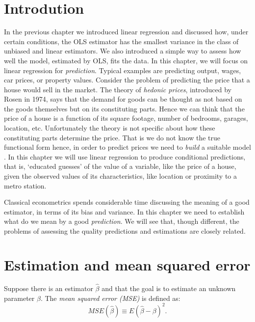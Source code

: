 \section{Introdution}



In the previous chapter we introduced linear regression and discussed how, under certain conditions, the OLS estimator has the smallest variance in the class of unbiased and linear estimators.  We also introduced a simple way to assess how well the model, estimated by OLS, fits the data. In this chapter, we will focus on linear regression for \emph{prediction}. Typical examples are predicting output, wages, car prices, or property values. Consider the problem of predicting the price that a house would sell in the market. The theory of \emph{hedonic prices}, introduced by Rosen in 1974\cite{rosen1974hedonic}, says that the demand for goods can be thought as not based on the goods themselves but on its constituting parts. Hence we can think that the  price of a house  is a function of its square footage, number of bedrooms, garages,  location, etc. Unfortunately the theory is not specific about how these constituting parts determine the price. That is we do not know the true functional form hence, in order to predict prices we need to \emph{build} a suitable model . In this chapter we will use linear regression to produce conditional predictions, that is, `educated guesses' of the value of a variable, like the price of a house, given the observed values of its characteristics, like location or proximity to a metro station. 

Classical econometrics spends considerable time discussing the meaning of a good estimator, in terms of its bias and variance. In this chapter we need to establish what do we mean by a good \emph{prediction}. We will see that, though different, the problems of assessing the quality predictions and estimations are closely related. 


\section{Estimation and mean squared error}


Suppose there is an estimator $\hat \beta$ and that the goal is to estimate an unknown parameter $\beta$. The \emph{mean squared error (MSE)} is defined as:
\[MSE(\hat \beta) \equiv E \left(\hat \beta -\beta \right)^2.\]

